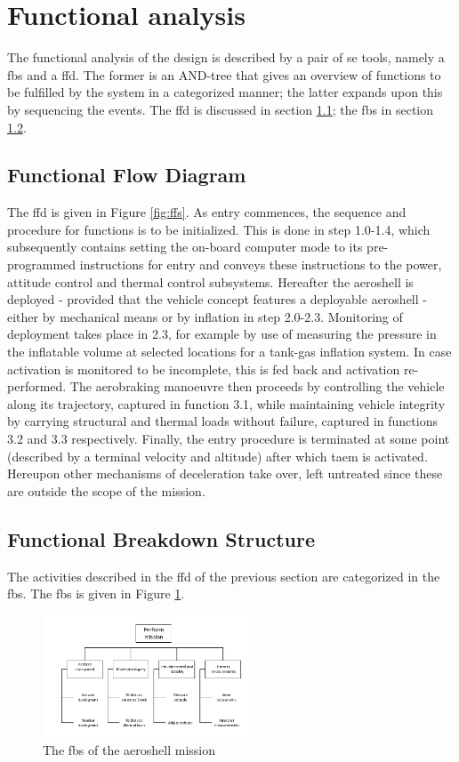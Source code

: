 \section{Functional analysis}\label{ch:func}

The functional analysis of the design is described by a pair of \gls{se} tools, namely a \gls{fbs} and a \gls{ffd}. The former is an AND-tree that gives an overview of functions to be fulfilled by the system in a categorized manner; the latter expands upon this by sequencing the events. The \gls{ffd} is discussed in section \ref{sec:ffd}; the \gls{fbs} in section \ref{sec:fbs}.

\subsection{Functional Flow Diagram} \label{sec:ffd}
The \gls{ffd} is given in Figure \ref{fig:ffs}. As entry commences, the sequence and procedure for functions is to be initialized. This is done in step 1.0-1.4, which subsequently contains setting the on-board computer mode to its pre-programmed instructions for entry and conveys these instructions to the power, attitude control and thermal control subsystems. Hereafter the aeroshell is deployed - provided that the vehicle concept features a deployable aeroshell - either by mechanical means or by inflation in step 2.0-2.3. Monitoring of deployment takes place in 2.3, for example by use of measuring the pressure in the inflatable volume at selected locations for a tank-gas inflation system. In case activation is monitored to be incomplete, this is fed back and activation re-performed. The aerobraking manoeuvre then proceeds by controlling the vehicle along its trajectory, captured in function 3.1, while maintaining vehicle integrity by carrying structural and thermal loads without failure, captured in functions 3.2 and 3.3 respectively. Finally, the entry procedure is terminated at some point (described by a terminal velocity and altitude) after which \gls{taem} is activated. Hereupon other mechanisms of deceleration take over, left untreated since these are outside the scope of the mission.

\subsection{Functional Breakdown Structure} \label{sec:fbs}
The activities described in the \gls{ffd} of the previous section are categorized in the \gls{fbs}. The \gls{fbs} is given in Figure \ref{fig:fbd}.
\begin{figure}[H]
\centering
\includegraphics[width = 0.55\textwidth]{Figure/FBS.pdf}
\caption{The \gls{fbs} of the aeroshell mission}
\label{fig:fbd}
\end{figure}

